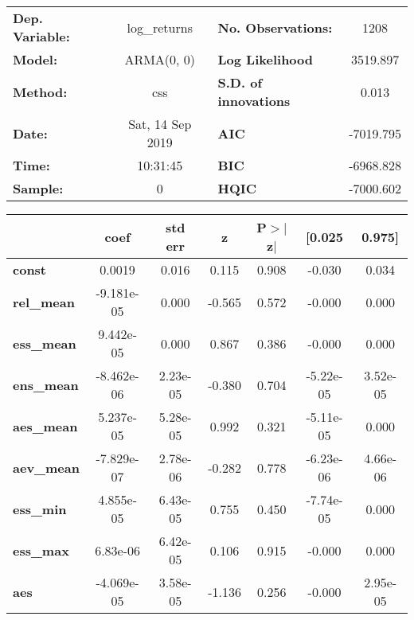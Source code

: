 \begin{center}
\begin{tabular}{lclc}
\toprule
\textbf{Dep. Variable:} &   log\_returns   & \textbf{  No. Observations:  } &    1208     \\
\textbf{Model:}         &    ARMA(0, 0)    & \textbf{  Log Likelihood     } &  3519.897   \\
\textbf{Method:}        &       css        & \textbf{  S.D. of innovations} &   0.013     \\
\textbf{Date:}          & Sat, 14 Sep 2019 & \textbf{  AIC                } & -7019.795   \\
\textbf{Time:}          &     10:31:45     & \textbf{  BIC                } & -6968.828   \\
\textbf{Sample:}        &        0         & \textbf{  HQIC               } & -7000.602   \\
\bottomrule
\end{tabular}
\begin{tabular}{lcccccc}
                   & \textbf{coef} & \textbf{std err} & \textbf{z} & \textbf{P$> |$z$|$} & \textbf{[0.025} & \textbf{0.975]}  \\
\midrule
\textbf{const}     &       0.0019  &        0.016     &     0.115  &         0.908        &       -0.030    &        0.034     \\
\textbf{rel\_mean} &   -9.181e-05  &        0.000     &    -0.565  &         0.572        &       -0.000    &        0.000     \\
\textbf{ess\_mean} &    9.442e-05  &        0.000     &     0.867  &         0.386        &       -0.000    &        0.000     \\
\textbf{ens\_mean} &   -8.462e-06  &     2.23e-05     &    -0.380  &         0.704        &    -5.22e-05    &     3.52e-05     \\
\textbf{aes\_mean} &    5.237e-05  &     5.28e-05     &     0.992  &         0.321        &    -5.11e-05    &        0.000     \\
\textbf{aev\_mean} &   -7.829e-07  &     2.78e-06     &    -0.282  &         0.778        &    -6.23e-06    &     4.66e-06     \\
\textbf{ess\_min}  &    4.855e-05  &     6.43e-05     &     0.755  &         0.450        &    -7.74e-05    &        0.000     \\
\textbf{ess\_max}  &     6.83e-06  &     6.42e-05     &     0.106  &         0.915        &       -0.000    &        0.000     \\
\textbf{aes}       &   -4.069e-05  &     3.58e-05     &    -1.136  &         0.256        &       -0.000    &     2.95e-05     \\
\bottomrule
\end{tabular}
\end{center}
